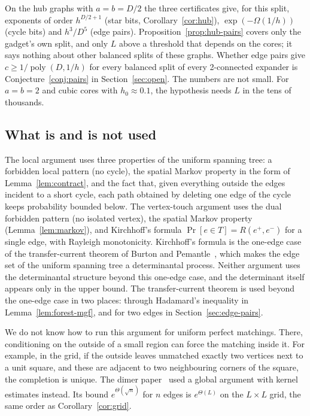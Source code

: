 On the hub graphs with $a=b=D/2$ the three certificates give, for this split, exponents of order $h^{D/2+1}$ (star bits, Corollary~\ref{cor:hub}), $\exp(-\Omega(1/h))$ (cycle bits) and $h^3/D^5$ (edge pairs). Proposition~\ref{prop:hub-pairs} covers only the gadget's own split, and only $L$ above a threshold that depends on the cores; it says nothing about other balanced splits of these graphs. Whether edge pairs give $c\ge1/\operatorname{poly}(D,1/h)$ for every balanced split of every 2-connected expander is Conjecture~\ref{conj:pairs} in Section~\ref{sec:open}. The numbers are not small. For $a=b=2$ and cubic cores with $h_0\approx0.1$, the hypothesis needs $L$ in the tens of thousands.

\subsection{What is and is not used}

The local argument uses three properties of the uniform spanning tree: a forbidden local pattern (no cycle), the spatial Markov property in the form of Lemma~\ref{lem:contract}, and the fact that, given everything outside the edges incident to a short cycle, each path obtained by deleting one edge of the cycle keeps probability bounded below. The vertex-touch argument uses the dual forbidden pattern (no isolated vertex), the spatial Markov property (Lemma~\ref{lem:markov}), and Kirchhoff's formula $\Pr[e\in T]=R(e^+,e^-)$ for a single edge, with Rayleigh monotonicity. Kirchhoff's formula is the one-edge case of the transfer-current theorem of Burton and Pemantle~\cite{BurtonPemantle93}, which makes the edge set of the uniform spanning tree a determinantal process. Neither argument uses the determinantal structure beyond this one-edge case, and the determinant itself appears only in the upper bound. The transfer-current theorem is used beyond the one-edge case in two places: through Hadamard's inequality in Lemma~\ref{lem:forest-mgf}, and for two edges in Section~\ref{sec:edge-pairs}.

We do not know how to run this argument for uniform perfect matchings. There, conditioning on the outside of a small region can force the matching inside it. For example, in the grid, if the outside leaves unmatched exactly two vertices next to a unit square, and these are adjacent to two neighbouring corners of the square, the completion is unique. The dimer paper~\cite{Blaschke26Dimers} used a global argument with kernel estimates instead. Its bound $e^{\Theta(\sqrt n)}$ for $n$ edges is $e^{\Theta(L)}$ on the $L\times L$ grid, the same order as Corollary~\ref{cor:grid}.

